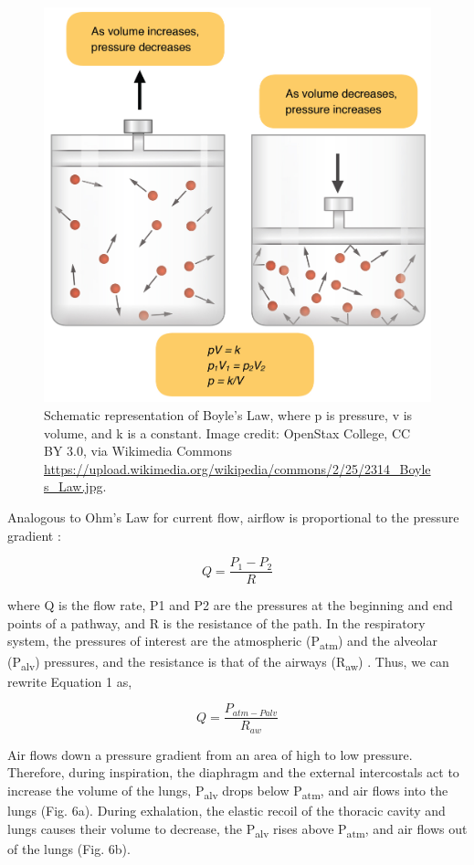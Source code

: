 \documentclass{article}
\begin{document}
\begin{figure}[!htbp]
\centering
\includegraphics[width=0.6\linewidth]{files/EPpXta8zJdzN048lz8AR-56e2dd07bc177613831a9f20e32af89e.jpeg}
\caption[]{Schematic representation of Boyle's Law, where p is pressure, v is volume, and k is a constant. Image credit: OpenStax College, CC BY 3.0, via Wikimedia Commons \href{https://upload.wikimedia.org/wikipedia/commons/2/25/2314\_Boyles\_Law.jpg}{https://upload.wikimedia.org/wikipedia/commons/2/25/2314\_Boyles\_Law.jpg}.}
\label{Vd0DOJxMEb}
\end{figure}

Analogous to Ohm's Law for current flow, airflow is proportional to the pressure gradient \citep{sanchez2010respiratory}:

\begin{equation}
\label{cO1EgJnEDz}
Q = \frac{P_1-P_2}{R}
\end{equation}

where Q is the flow rate, P1 and P2 are the pressures at the beginning and end points of a pathway, and R is the resistance of the path. In the respiratory system, the pressures of interest are the atmospheric (P\textsubscript{atm}) and the alveolar (P\textsubscript{alv}) pressures, and the resistance is that of the airways (R\textsubscript{aw}) \citep{sanchez2010respiratory}. Thus, we can rewrite Equation 1 as,

\begin{equation}
\label{ZdQ2MGbbYg}
Q = \frac{P_{atm-P{alv}}}{R_{aw}}
\end{equation}

Air flows down a pressure gradient from an area of high to low pressure. Therefore, during inspiration, the diaphragm and the external intercostals act to increase the volume of the lungs, P\textsubscript{alv} drops below P\textsubscript{atm}, and air flows into the lungs (Fig. 6a). During exhalation, the elastic recoil of the thoracic cavity and lungs causes their volume to decrease, the P\textsubscript{alv} rises above P\textsubscript{atm}, and air flows out of the lungs (Fig. 6b).
\end{document}
